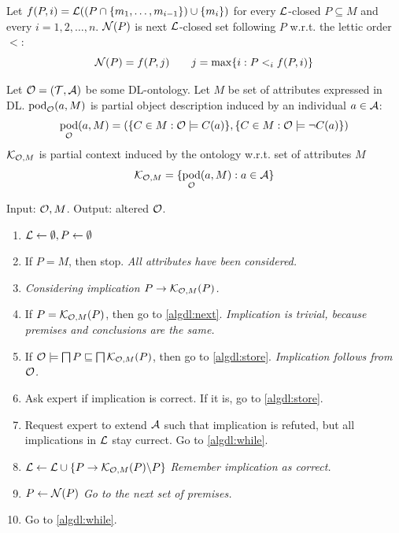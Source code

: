 \documentclass{llncs}
\newcommand{\pc}{\ensuremath\mathcal{K}}
\newcommand{\soi}{\ensuremath\mathcal{L}}
\newcommand{\next}{\ensuremath\mathcal{N}}
\newcommand{\ont}{\ensuremath\mathcal{O}}
\newcommand{\tbox}{\ensuremath\mathcal{T}}
\newcommand{\abox}{\ensuremath\mathcal{A}}
\DeclareMathOperator{\POD}{pod}
\newcommand{\comment}[1]{\emph{#1}}
\begin{document}
\begin{definition}
Let $f(P,i)=\soi((P\cap \{m_1,\ldots,m_{i-1}\})\cup\{m_i\})$ for every $\soi$-closed $P\subseteq M$ and every $i=1,2,\ldots,n$.
$\next(P)$ is next $\soi$-closed set following $P$ w.r.t. the lettic order $<$: 
\[\next(P)=f(P,j) \qquad j=\max\{i: P<_i f(P,i)\} \]
\end{definition}

Let $\ont=(\tbox,\abox)$ be some DL-ontology. Let $M$ be set of attributes expressed in DL. 
$\POD_\ont(a,M)$ is partial object description induced by an individual $a\in\abox$:
\[ \POD_\ont(a,M)=\left(\{C\in M: \ont\models C(a)\}, \{C\in M: \ont\models \lnot C(a)\}\right) \]
$\pc_{\ont,M}$ is partial context induced by the ontology w.r.t. set of attributes $M$
\[ \pc_{\ont,M}=\{\POD_\ont(a,M): a\in\abox \} \]

\begin{definition}
Input: $\ont, M$. Output: altered $\ont$.
\begin{enumerate}
\item $\soi\leftarrow \emptyset, P\leftarrow \emptyset$
\item\label{algdl:while} If $P=M$, then stop. \comment{All attributes have been considered.}
\item \comment{Considering implication $P\to\pc_{\ont,M}(P)$.}
\item If $P=\pc_{\ont,M}(P)$, then go to \ref{algdl:next}. \comment{Implication is trivial, because premises and conclusions are the same.}
\item If $\ont\models \bigsqcap P \sqsubseteq \bigsqcap \pc_{\ont,M}(P)$, then go to \ref{algdl:store}. \comment{Implication follows from $\ont$.}
\item Ask expert if implication is correct. If it is, go to \ref{algdl:store}.
\item Request expert to extend $\abox$ such that implication is refuted, but all implications in $\soi$ stay currect. Go to \ref{algdl:while}.
\item \label{algdl:store} $\soi\leftarrow \soi\cup \{P\to\pc_{\ont,M}(P)\backslash P\}$ \comment{Remember implication as correct.}
\item \label{algdl:next} $P\leftarrow \next(P)$ \comment{Go to the next set of premises.}
\item Go to \ref{algdl:while}.
\end{enumerate}
\end{definition}
\end{document}
